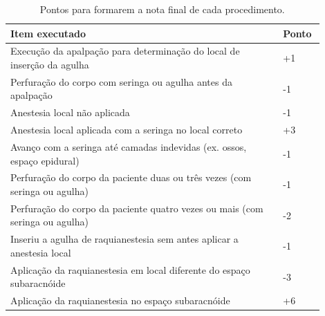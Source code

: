 \begin{table}[!ht]
\begin{center}
\caption{Pontos para formarem a nota final de cada procedimento.}
\label{tab:PontosNotaProcedimento}
\begin{tabular}{|p{0.8\linewidth}|p{0.1\linewidth}|}
\hline
\textbf{Item executado} & \textbf{Ponto}\\
\hline\hline
Execução da apalpação para determinação do local de inserção da agulha & +1\\
Perfuração do corpo com seringa ou agulha antes da apalpação & -1\\
Anestesia local não aplicada & -1\\
Anestesia local aplicada com a seringa no local correto & +3\\
Avanço com a seringa até camadas indevidas (ex. ossos, espaço epidural) & -1\\
Perfuração do corpo da paciente duas ou três vezes (com seringa ou agulha) & -1\\
Perfuração do corpo da paciente quatro vezes ou mais (com seringa ou agulha) & -2\\
Inseriu a agulha de raquianestesia sem antes aplicar a anestesia local & -1\\
Aplicação da raquianestesia em local diferente do espaço subaracnóide & -3\\
Aplicação da raquianestesia no espaço subaracnóide & +6\\
\hline
\end{tabular}
\end{center}
\end{table}

